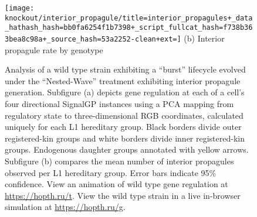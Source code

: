 \begin{figure}[!htbp]
\begin{center}
\begin{minipage}[t]{0.5\linewidth}
\begin{minipage}[t]{\linewidth}
\centering
\vspace{0pt} %
\begin{minipage}[b]{\linewidth}
\texttt{[image: knockout/interior\_propagule/title=interior\_propagules+\_data\_hathash\_hash=bb0fa6254f1b7398+\_script\_fullcat\_hash=f738b363bea8c98a+\_source\_hash=53a2252-clean+ext=]}%
{(b) Interior propagule rate by genotype}
\end{minipage}
\end{minipage}%
\hspace*{\fill}

\end{minipage}

\caption{
Analysis of a wild type strain exhibiting a ``burst'' lifecycle evolved under the ``Nested-Wave'' treatment exhibiting interior propagule generation.
Subfigure (a) depicts gene regulation at each of a cell's four directional SignalGP instances using a PCA mapping from regulatory state to three-dimensional RGB coordinates, calculated uniquely for each L1 hereditary group.
Black borders divide outer registered-kin groups and white borders divide inner registered-kin groups.
Endogenous daughter groups annotated with yellow arrows.
Subfigure (b) compares the mean number of interior propagules observed per L1 hereditary group.
Error bars indicate 95\% confidence.
View an animation of wild type gene regulation at \url{https://hopth.ru/t}.
View the wild type strain in a live in-browser simulation at \url{https://hopth.ru/g}.
}
\label{fig:ko-interior_propagule}
\end{center}
\end{figure}
